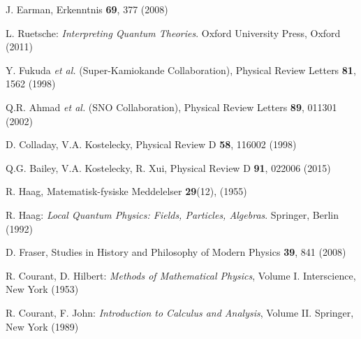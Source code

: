 \documentclass[final,3p,12pt]{elsarticle3}
\begin{document}
\begin{thebibliography}{88}
J. Earman, Erkenntnis {\bf 69}, 377 (2008)

L. Ruetsche: {\it Interpreting Quantum Theories}. Oxford University Press,
Oxford (2011)

Y. Fukuda {\it et al.} (Super-Kamiokande Collaboration), 
Physical Review Letters {\bf 81}, 1562 (1998)

Q.R. Ahmad {\it et al.} (SNO Collaboration),
Physical Review Letters {\bf 89}, 011301 (2002)

D. Colladay, V.A. Kostelecky,
Physical Review D {\bf 58}, 116002 (1998)

Q.G. Bailey, V.A. Kostelecky, R. Xui,
Physical Review D {\bf 91}, 022006 (2015)

R. Haag, Matematisk-fysiske Meddelelser {\bf 29}(12), (1955)

R. Haag: {\it Local Quantum Physics: Fields, Particles, Algebras}.
Springer, Berlin (1992)

D. Fraser, 
Studies in History and Philosophy of Modern Physics {\bf 39}, 841 (2008)

R. Courant, D. Hilbert: {\it Methods of Mathematical Physics}, Volume I.
Interscience, New York (1953) %

R. Courant, F. John: {\it Introduction to Calculus and Analysis}, Volume II.
Springer, New York (1989) %

\end{thebibliography}
\end{document}
